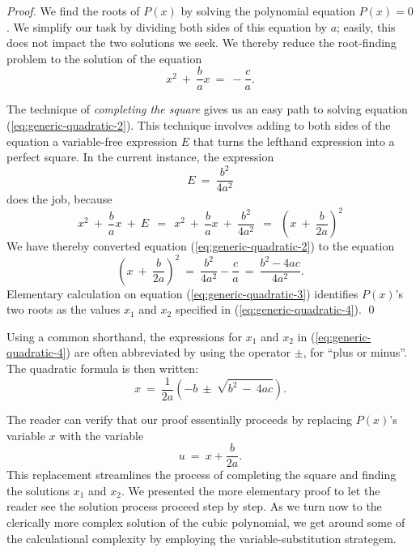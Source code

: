 \begin{proof}
We find the roots of $P(x)$ by solving the polynomial equation $P(x) =
0$.  We simplify our task by dividing both sides of this equation by
$a$; easily, this does not impact the two solutions we seek.  We
thereby reduce the root-finding problem to the solution of the
equation
\begin{equation}
\label{eq:generic-quadratic-2}
x^2 \ + \ \frac{b}{a} x \ = \ - \frac{c}{a}.
\end{equation}

The technique of {\it completing the square}
 gives us an easy
path to solving equation (\ref{eq:generic-quadratic-2}).  This
technique involves adding to both sides of the equation a
variable-free expression $E$ that turns the lefthand expression into a
perfect square.  In the current instance, the expression
\[ E \ = \ \frac{b^2}{4a^2} \]
does the job, because
\[
x^2 \ + \ \frac{b}{a} x \ + \ E \ \ = \ \
x^2 \ + \ \frac{b}{a} x \ + \ \frac{b^2}{4a^2}
   \ \ = \ \ \left( x \ + \ \frac{b}{2a} \right)^2
\]
We have thereby converted equation (\ref{eq:generic-quadratic-2}) to
the equation
\begin{equation}
\label{eq:generic-quadratic-3}
\left( x \ + \ \frac{b}{2a} \right)^2
  \ = \ \frac{b^2}{4a^2} - \frac{c}{a}
  \ = \ \frac{b^2 - 4ac}{4a^2}.
\end{equation}
Elementary calculation on equation (\ref{eq:generic-quadratic-3})
identifies $P(x)$'s two roots as the values $x_1$ and $x_2$ specified
in (\ref{eq:generic-quadratic-4}).  \qed
\end{proof}

Using a common shorthand, the expressions for $x_1$ and $x_2$ in
(\ref{eq:generic-quadratic-4}) are often abbreviated by using the
operator $\pm$, for ``plus or minus''.  
The quadratic formula is then written:
\[
x \ = \  \frac{1}{2a} \left( -b \ \pm \ \sqrt{b^2 \ - \ 4ac} \right).
\]


\smallskip

The reader can verify that our proof essentially proceeds by
replacing $P(x)$'s variable $x$ with the variable
\[ u \ = \ x + \frac{b}{2a}. \]
This replacement streamlines the process of completing the square and
finding the solutions $x_1$ and $x_2$.  We presented the more
elementary proof to let the reader see the solution process proceed
step by step.  As we turn now to the clerically more complex solution
of the cubic polynomial, we get around some of the calculational
complexity by employing the variable-substitution strategem.

